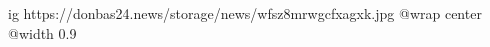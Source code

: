 
 
 
 
 

\ifcmt
  ig https://donbas24.news/storage/news/wfsz8mrwgcfxagxk.jpg
  @wrap center
  @width 0.9
\fi
